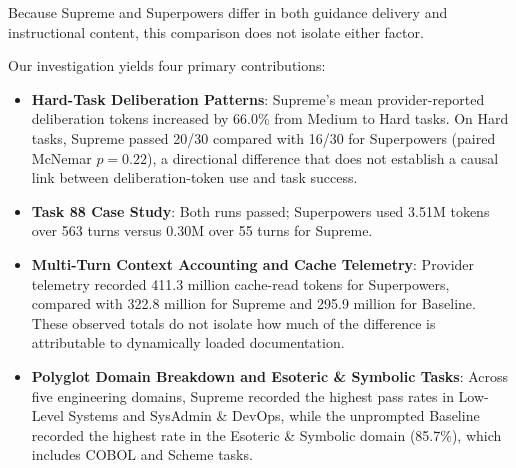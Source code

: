 Because Supreme and Superpowers differ in both guidance delivery and instructional content, this comparison does not isolate either factor.

Our investigation yields four primary contributions:
\begin{itemize}
    \item \textbf{Hard-Task Deliberation Patterns}: Supreme's mean provider-reported deliberation tokens increased by 66.0\% from Medium to Hard tasks. On Hard tasks, Supreme passed 20/30 compared with 16/30 for Superpowers (paired McNemar $p = 0.22$), a directional difference that does not establish a causal link between deliberation-token use and task success.
    \item \textbf{Task 88 Case Study}: Both runs passed; Superpowers used 3.51M tokens over 563 turns versus 0.30M over 55 turns for Supreme.
    \item \textbf{Multi-Turn Context Accounting and Cache Telemetry}: Provider telemetry recorded 411.3 million cache-read tokens for Superpowers, compared with 322.8 million for Supreme and 295.9 million for Baseline. These observed totals do not isolate how much of the difference is attributable to dynamically loaded documentation.
    \item \textbf{Polyglot Domain Breakdown and Esoteric \& Symbolic Tasks}: Across five engineering domains, Supreme recorded the highest pass rates in Low-Level Systems and SysAdmin \& DevOps, while the unprompted Baseline recorded the highest rate in the Esoteric \& Symbolic domain (85.7\%), which includes COBOL and Scheme tasks.
\end{itemize}
